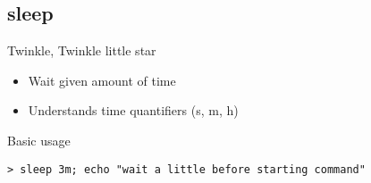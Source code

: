 \subsection{sleep}

\begin{frame}[fragile]{Twinkle, Twinkle little star}
  \begin{itemize}
    \pause \item Wait given amount of time
    \pause \item Understands time quantifiers (s, m, h)
  \end{itemize}
  \pause

  \begin{exampleblock}{Basic usage}
    \begin{lstlisting}[showstringspaces=false,basicstyle=\tiny]
> sleep 3m; echo "wait a little before starting command"
    \end{lstlisting}
  \end{exampleblock}
\end{frame}


